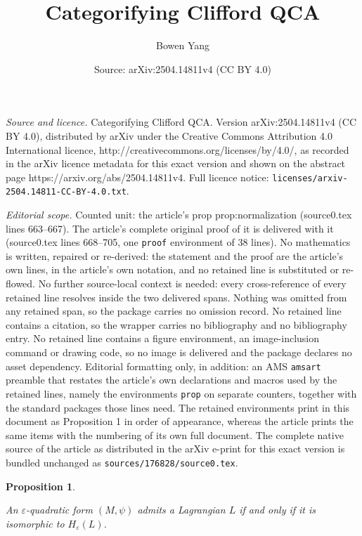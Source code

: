 \documentclass[10pt,a4paper]{amsart}
\title{Categorifying Clifford QCA}
\author{Bowen Yang}
\date{Source: arXiv:2504.14811v4 (CC BY 4.0)}
\newtheorem{prop}{Proposition}
\begin{document}
\maketitle

\noindent\emph{Source and licence.} Categorifying Clifford QCA. Version arXiv:2504.14811v4 (CC BY 4.0), distributed by arXiv under the Creative Commons Attribution 4.0 International licence, http://creativecommons.org/licenses/by/4.0/, as recorded in the arXiv licence metadata for this exact version and shown on the abstract page https://arxiv.org/abs/2504.14811v4. Full licence notice: \texttt{licenses/arxiv-2504.14811-CC-BY-4.0.txt}.\par\smallskip

\noindent\textit{Editorial scope.} Counted unit: the article's prop prop:normalization (source0.tex lines 663--667). The article's complete original proof of it is delivered with it (source0.tex lines 668--705, one \texttt{proof} environment of 38 lines). No mathematics is written, repaired or re-derived: the statement and the proof are the article's own lines, in the article's own notation, and no retained line is substituted or re-flowed.  No further source-local context is needed: every cross-reference of every retained line resolves inside the two delivered spans.  Nothing was omitted from any retained span, so the package carries no omission record.  No retained line contains a citation, so the wrapper carries no bibliography and no bibliography entry.  No retained line contains a figure environment, an image-inclusion command or drawing code, so no image is delivered and the package declares no asset dependency.  Editorial formatting only, in addition: an AMS \texttt{amsart} preamble that restates the article's own declarations and macros used by the retained lines, namely the environments \texttt{prop} on separate counters, together with the standard packages those lines need.  The retained environments print in this document as Proposition 1 in order of appearance, whereas the article prints the same items with the numbering of its own full document.  The complete native source of the article as distributed in the arXiv e-print for this exact version is bundled unchanged as \texttt{sources/176828/source0.tex}.
\begin{prop}\label{prop:normalization}
    
An \( \varepsilon \)-quadratic form \( (M, \psi) \) admits a Lagrangian \( L \) if and only if it is isomorphic to \( H_\varepsilon(L) \).

\end{prop} 
\end{document}
